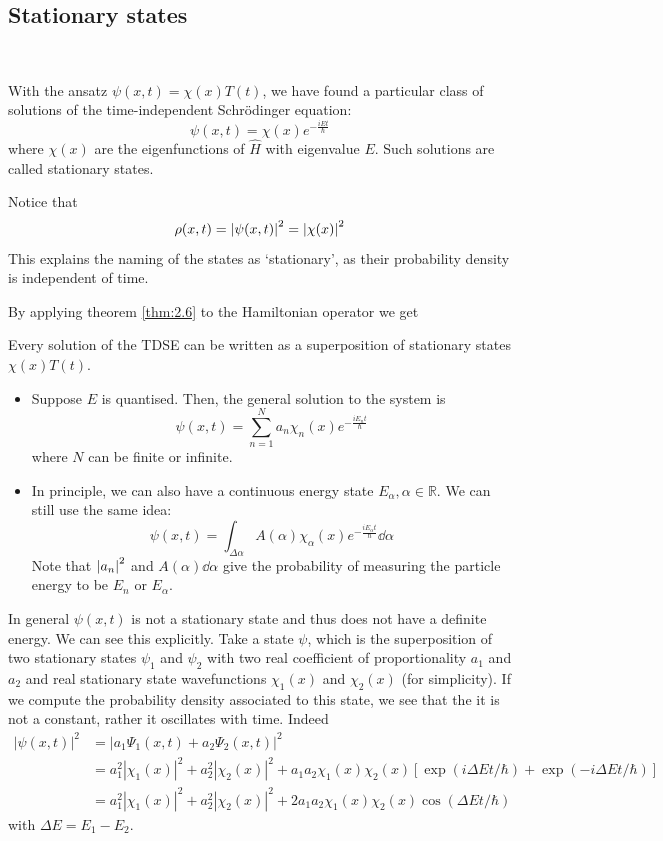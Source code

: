 \documentclass[a4paper]{article}
\begin{document}
\subsection{Stationary states}\ \vspace{-1.5em}
\begin{definition}
	With the ansatz \( \psi(x,t) = \chi(x) T(t) \), we have found a particular class of solutions of the time-independent Schr\"odinger equation:
	\[
		\psi(x,t) = \chi(x) e^{-\frac{i E t}{\hbar}}
	\]
	where \( \chi(x) \) are the eigenfunctions of \( \hat H \) with eigenvalue \( E \).
	Such solutions are called stationary states.
\end{definition}

\begin{note}
    Notice that \[
        \rho(x,t) = \abs{\psi(x,t)}^2 = \abs{\chi(x)}^2
    \]
    This explains the naming of the states as `stationary', as their probability density is independent of time.
\end{note}

By applying theorem \ref{thm:2.6} to the Hamiltonian operator we get
\begin{theorem}
    Every solution of the TDSE can be written as a superposition of stationary states $\chi(x) T(t)$.
\end{theorem}

\begin{itemize}
    \item Suppose \( E \) is quantised.
    Then, the general solution to the system is
    \[
        \psi(x,t) = \sum_{n=1}^N a_n \chi_n(x) e^{-\frac{iE_n t}{\hbar}}
    \]
    where \( N \) can be finite or infinite.
    \item In principle, we can also have a continuous energy state \( E_\alpha, \alpha \in \mathbb R \).
    We can still use the same idea:
    \[
        \psi(x,t) = \int_{\Delta \alpha} A(\alpha) \chi_\alpha(x) e^{-\frac{iE_\alpha t}{\hbar}} \dd{\alpha}
    \]
    Note that \( \abs{a_n}^2 \) and \( A(\alpha) \dd{\alpha} \) give the probability of measuring the particle energy to be \( E_n \) or \( E_\alpha \).
\end{itemize}

In general $\psi(x, t)$ is not a stationary state and thus does not have a definite energy. We can see this explicitly. Take a state $\psi$, which is the superposition of two stationary states $\psi_1$ and $\psi_2$ with two real coefficient of proportionality $a_1$ and $a_2$ and real stationary state wavefunctions $\chi_1(x)$ and $\chi_2(x)$ (for simplicity). If we compute the probability density associated to this state, we see that the it is not a constant, rather it oscillates with time. Indeed
\[
\begin{aligned}
|\psi(x, t)|^2 &=\left|a_1 \Psi_1(x, t)+a_2 \Psi_2(x, t)\right|^2 \\
&=a_1^2\left|\chi_1(x)\right|^2+a_2^2\left|\chi_2(x)\right|^2+a_1 a_2 \chi_1(x) \chi_2(x)[\exp (i \Delta E t / \hbar)+\exp (-i \Delta E t / \hbar)] \\
&=a_1^2\left|\chi_1(x)\right|^2+a_2^2\left|\chi_2(x)\right|^2+2 a_1 a_2 \chi_1(x) \chi_2(x) \cos (\Delta E t / \hbar)
\end{aligned}
\]
with $\Delta E=E_1-E_2$.
\clearpage
\end{document}
